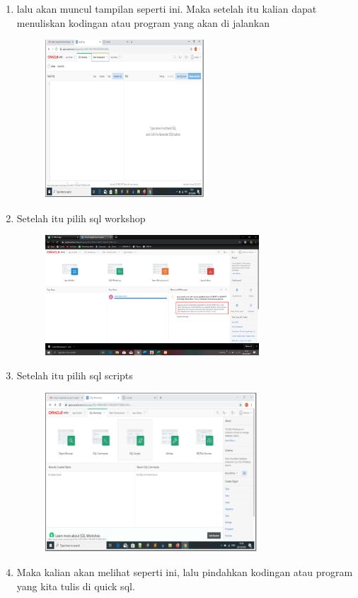 \documentclass{article}
\begin{document}
\begin{enumerate}
\begin{enumerate}
    \item lalu akan muncul tampilan seperti ini.  Maka setelah itu kalian dapat menuliskan kodingan atau program yang akan di jalankan
    \begin{figure}[h]
    \newpage \centerline{\includegraphics[width=6cm]{image/4.png}}
\end{figure}
    \item  Setelah itu pilih sql workshop
    \begin{figure}[h]
            \centerline{\includegraphics[width=8cm]{image/3.png}}
            \end{figure}
    \newpage \item Setelah itu pilih sql scripts
    \begin{figure}[h]
            \centerline{\includegraphics[width=8cm]{image/5.PNG}}
            \end{figure}
    \item Maka kalian akan melihat seperti ini, lalu pindahkan kodingan atau program yang kita tulis di quick sql.

\end{enumerate}
\end{enumerate}
\end{document}
